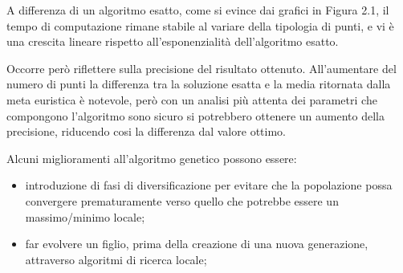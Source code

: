 A differenza di un algoritmo esatto, come si evince dai grafici in Figura 2.1, il tempo di computazione rimane stabile al variare della tipologia di punti, e vi è una crescita lineare rispetto all'esponenzialità dell'algoritmo esatto.

Occorre però riflettere sulla precisione del risultato ottenuto. All'aumentare del numero di punti la differenza tra la soluzione esatta e la media ritornata dalla meta euristica è notevole, però con un analisi più attenta dei parametri che compongono l'algoritmo sono sicuro si potrebbero ottenere un aumento della precisione, riducendo cosi la differenza dal valore ottimo.

Alcuni miglioramenti all'algoritmo genetico possono essere:

\begin{itemize}
\item introduzione di fasi di diversificazione per evitare che la popolazione possa convergere prematuramente verso quello che potrebbe essere un massimo/minimo locale;
\item far evolvere un figlio, prima della creazione di una nuova generazione, attraverso algoritmi di ricerca locale;
\end{itemize}